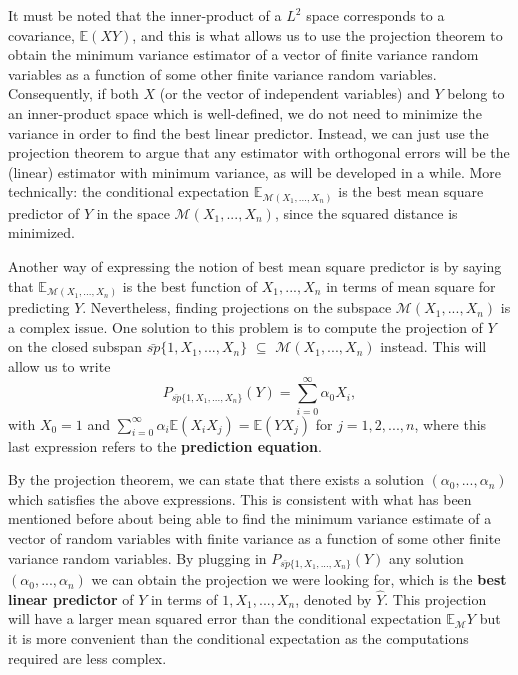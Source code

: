 \documentclass{article}
\begin{document}
It must be noted that the inner-product of a $L^2$ space corresponds to a covariance, $\mathbb E(XY)$, and this is what allows us to use the projection theorem to obtain the minimum variance estimator of a vector of finite variance random variables as a function of some other finite variance random variables. Consequently, if both $X$ (or the vector of independent variables) and $Y$ belong to an inner-product space which is well-defined, we do not need to minimize the variance in order to find the best linear predictor. Instead, we can just use the projection theorem to argue that any estimator with orthogonal errors will be the (linear) estimator with minimum variance, as will be developed in a while. More technically: the conditional expectation $\mathbb E_{\mathscr{M}(X_1,...,X_n)}$ is the best mean square predictor of $Y$ in the space $\mathscr{M}(X_1,...,X_n)$, since the squared distance is minimized. \newline

Another way of expressing the notion of best mean square predictor is by saying that $\mathbb E_{\mathscr{M}(X_1,...,X_n)}$ is the best function of $X_1,...,X_n$ in terms of mean square for predicting $Y$. Nevertheless, finding projections on the subspace $\mathscr{M}(X_1,...,X_n)$ is a complex issue. One solution to this problem is to compute the projection of $Y$ on the closed subspan $\bar{sp}\{1, X_1,...,X_n\}$ $\subseteq$ $\mathscr{M}(X_1,...,X_n)$ instead. This will allow us to write
\[
P_{\bar{sp}\{1, X_1,...,X_n\}}(Y) = \sum_{i=0}^{\infty} \alpha_0X_i,
\]
with $X_0=1$ and $\sum_{i=0}^{\infty} \alpha_i\mathbb E(X_iX_j) = \mathbb E(YX_j)$ for $j=1,2,...,n$, where this last expression refers to the \textbf{prediction equation}. \newline

By the projection theorem, we can state that there exists a solution $(\alpha_0,...,\alpha_n)$ which satisfies the above expressions. This is consistent with what has been mentioned before about being able to find the minimum variance estimate of a vector of random variables with finite variance as a function of some other finite variance random variables. By plugging in $P_{\bar{sp}\{1, X_1,...,X_n\}}(Y)$ any solution $(\alpha_0,...,\alpha_n)$ we can obtain the projection we were looking for, which is the \textbf{best linear predictor} of $Y$ in terms of $1,X_1,...,X_n$, denoted by $\hat{Y}$. This projection will have a larger mean squared error than the conditional expectation $\mathbb E_{\mathscr{M}}Y$ but it is more convenient than the conditional expectation as the computations required are less complex. \newline
\end{document}
